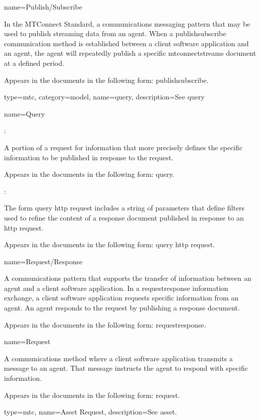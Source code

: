 {
  name={Publish/Subscribe}
}
{
	In the MTConnect Standard, a communications messaging pattern that may be used to publish \gls{streaming data} from an \gls{agent}.  When a \gls{publishsubscribe} communication method is established between a client software application and an \gls{agent}, the \gls{agent} will repeatedly publish a specific \glspl{mtconnectstream} document at a defined period.

	Appears in the documents in the following form: \gls{publishsubscribe}.
}

{
  type=mtc,
  category=model,
  name={query},
  description={See \gls{query}}
}



{
  name={Query}
}
{
	:

	A portion of a request for information that more precisely defines the specific information to be published in response to the request. 

	Appears in the documents in the following form: \gls{query}.

	:

	The form \gls{query http request} includes a string of parameters that define filters used to refine the content of a \gls{response document} published in response to an \gls{http request}.

	Appears in the documents in the following form: \gls{query http request}.
}


{
  name={Request/Response}
}
{
	A communications pattern that supports the transfer of information between an \gls{agent} and a client software application. In a \gls{requestresponse} information exchange, a client software application requests specific information from an \gls{agent}. An \gls{agent} responds to the \gls{request} by publishing a \gls{response document}.   

	Appears in the documents in the following form: \gls{requestresponse}.
}


{
  name={Request}
}
{
	A communications method where a client software application transmits a message to an \gls{agent}.  That message instructs the \gls{agent} to respond with specific information.

	Appears in the documents in the following form: \gls{request}.
}

{
  type=mtc,
  name={Asset Request},
  description={See \gls{asset}.}
}


